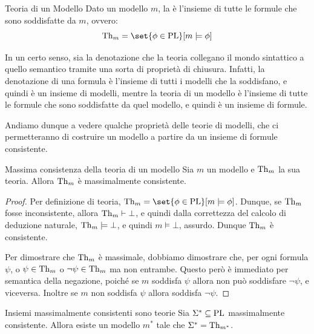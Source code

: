 \begin{definition}{Teoria di un Modello}
  Dato un modello \(m\), la  è l'insieme di tutte le formule che sono soddisfatte da \(m\), ovvero:
  \[\Th{m} = \set{\phi \in \PL }[ m \models \phi]\]
\end{definition}

In un certo senso, sia la denotazione che la teoria collegano il mondo sintattico a quello semantico tramite una sorta di proprietà di chiusura. Infatti, la denotazione di una formula è l'insieme di tutti i modelli che la soddisfano, e quindi è un insieme di modelli, mentre la teoria di un modello è l'insieme di tutte le formule che sono soddisfatte da quel modello, e quindi è un insieme di formule.

Andiamo dunque a vedere qualche proprietà delle teorie di modelli, che ci permetteranno di costruire un modello a partire da un insieme di formule consistente.

\begin{proposition}{Massima consistenza della teoria di un modello}
  Sia \(m\) un modello e \(\operatorname{Th}_{m}\) la sua teoria. Allora \(\operatorname{Th}_{m}\) è massimalmente consistente.
\end{proposition}

\begin{proof}
  Per definizione di teoria, \(\Th{m} = \set{\phi\in\PL}[m\models\phi]\). Dunque, se \(\operatorname{Th}_{m}\) fosse inconsistente, allora \(\operatorname{Th}_{m}\vdash\bot\), e quindi dalla correttezza del calcolo di deduzione naturale, \(\operatorname{Th}_{m}\models\bot\), e quindi \(m\models\bot\), assurdo. Dunque \(\operatorname{Th}_{m}\) è consistente.

  Per dimostrare che \(\operatorname{Th}_{m}\) è massimale, dobbiamo dimostrare che, per ogni formula \(\psi\), o \(\psi\in\operatorname{Th}_{m}\) o \(\neg\psi\in\operatorname{Th}_{m}\) ma non entrambe. Questo però è immediato per semantica della negazione, poiché se \(m\) soddisfa \(\psi\) allora non può soddisfare \(\neg\psi\), e viceversa. Inoltre se \(m\) non soddisfa \(\psi\) allora soddisfa \(\neg\psi\).
\end{proof}

\begin{proposition}[label=prop:max-consistent-set-are-theory]{Insiemi massimalmente consistenti sono teorie}
  Sia \(\Sigma^* \subseteq \operatorname{PL}\) massimalmente consistente. Allora esiste un modello \(m^*\) tale che \(\Sigma^* = \operatorname{Th}_{m^*}\).
\end{proposition}

